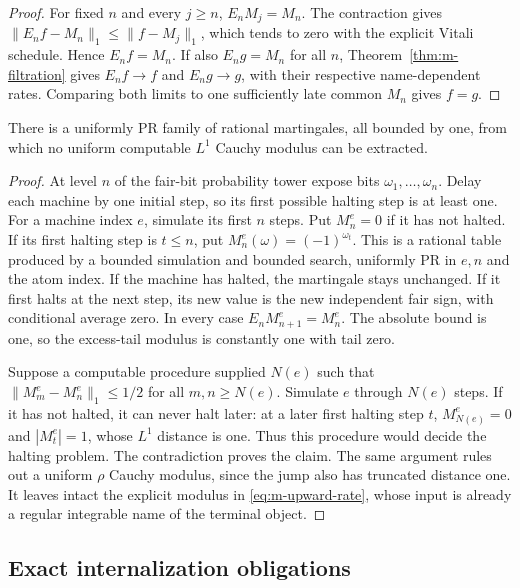 \begin{proof}
For fixed $n$ and every $j\ge n$, $E_nM_j=M_n$.  The contraction gives
$\|E_nf-M_n\|_1\le\|f-M_j\|_1$, which tends to zero with the explicit
Vitali schedule.  Hence $E_nf=M_n$.  If also $E_ng=M_n$ for all $n$,
Theorem~\ref{thm:m-filtration} gives $E_nf\to f$ and $E_ng\to g$,
with their respective name-dependent rates.  Comparing both limits to
one sufficiently late common $M_n$ gives $f=g$.
\end{proof}

\begin{proposition}
\label{prop:m-martingale-barrier}
There is a uniformly PR family of rational martingales, all bounded by
one, from which no uniform computable $L^1$ Cauchy modulus can be
extracted.
\end{proposition}

\begin{proof}
At level $n$ of the fair-bit probability tower expose bits
$\omega_1,\ldots,\omega_n$.  Delay each machine by one initial step, so
its first possible halting step is at least one.  For a machine index $e$, simulate its first
$n$ steps.  Put $M^e_n=0$ if it has not halted.  If its first halting step
is $t\le n$, put $M^e_n(\omega)=(-1)^{\omega_t}$.  This is a rational
table produced by a bounded simulation and bounded search, uniformly PR
in $e,n$ and the atom index.  If the machine has halted, the martingale
stays unchanged.  If it first halts at the next step, its new value is the
new independent fair sign, with conditional average zero.  In every
case $E_nM^e_{n+1}=M^e_n$.  The absolute bound is one, so the excess-tail
modulus is constantly one with tail zero.

Suppose a computable procedure supplied $N(e)$ such that
$\|M^e_m-M^e_n\|_1\le1/2$ for all $m,n\ge N(e)$.  Simulate $e$ through
$N(e)$ steps.  If it has not halted, it can never halt later: at a later
first halting step $t$, $M^e_{N(e)}=0$ and $|M^e_t|=1$, whose $L^1$
distance is one.  Thus this procedure would decide the halting problem.
The contradiction proves the claim.  The same argument rules out a
uniform $\rho$ Cauchy modulus, since the jump also has truncated distance
one.  It leaves intact the explicit modulus in
\eqref{eq:m-upward-rate}, whose input is already a regular integrable
name of the terminal object.
\end{proof}

\subsection{Exact internalization obligations}


